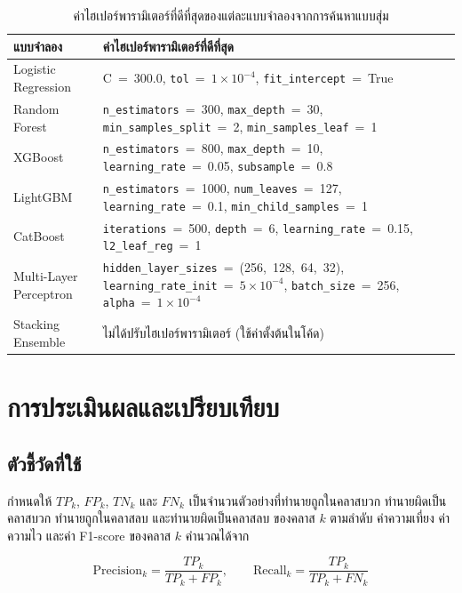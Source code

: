 \begin{table}[ht]
    \caption{ค่าไฮเปอร์พารามิเตอร์ที่ดีที่สุดของแต่ละแบบจำลองจากการค้นหาแบบสุ่ม}
    \label{tab:best-params}
    \small
    \begin{tabularx}{\linewidth}{@{}l >{\raggedright\arraybackslash}X@{}}
        \hline
        \textbf{แบบจำลอง} & \textbf{ค่าไฮเปอร์พารามิเตอร์ที่ดีที่สุด} \\
        \hline
        Logistic Regression & {C}~=~300.0, \texttt{tol}~=~$1\times10^{-4}$, \texttt{fit\_intercept}~=~True \\
        Random Forest & \texttt{n\_estimators}~=~300, \texttt{max\_depth}~=~30, \texttt{min\_samples\_split}~=~2, \texttt{min\_samples\_leaf}~=~1 \\
        XGBoost & \texttt{n\_estimators}~=~800, \texttt{max\_depth}~=~10, \texttt{learning\_rate}~=~0.05, \texttt{subsample}~=~0.8 \\
        LightGBM & \texttt{n\_estimators}~=~1000, \texttt{num\_leaves}~=~127, \texttt{learning\_rate}~=~0.1, \texttt{min\_child\_samples}~=~1 \\
        CatBoost & \texttt{iterations}~=~500, \texttt{depth}~=~6, \texttt{learning\_rate}~=~0.15, \texttt{l2\_leaf\_reg}~=~1 \\
        Multi-Layer Perceptron & \texttt{hidden\_layer\_sizes}~=~(256,~128,~64,~32), \texttt{learning\_rate\_init}~=~$5\times10^{-4}$, \texttt{batch\_size}~=~256, \texttt{alpha}~=~$1\times10^{-4}$ \\
        Stacking Ensemble & ไม่ได้ปรับไฮเปอร์พารามิเตอร์ (ใช้ค่าตั้งต้นในโค้ด) \\
        \hline
    \end{tabularx}
\end{table}

\section{การประเมินผลและเปรียบเทียบ}

\subsection{ตัวชี้วัดที่ใช้}

กำหนดให้ $TP_{k}$, $FP_{k}$, $TN_{k}$ และ $FN_{k}$ เป็นจำนวนตัวอย่างที่ทำนายถูกในคลาสบวก ทำนายผิดเป็นคลาสบวก ทำนายถูกในคลาสลบ และทำนายผิดเป็นคลาสลบ ของคลาส $k$ ตามลำดับ ค่าความเที่ยง ค่าความไว และค่า F1-score ของคลาส $k$ คำนวณได้จาก

\begin{equation}
    \mathrm{Precision}_{k} = \frac{TP_{k}}{TP_{k} + FP_{k}}, \qquad
    \mathrm{Recall}_{k} = \frac{TP_{k}}{TP_{k} + FN_{k}}
\end{equation}

